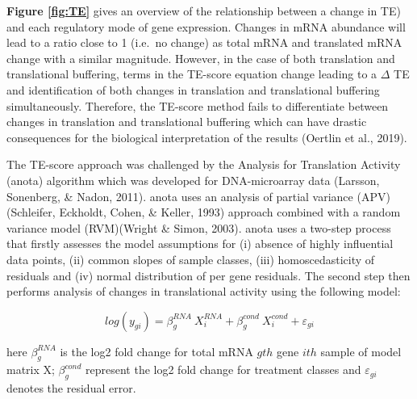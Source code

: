 \documentclass[12pt,openany]{book}
\begin{document}
\textbf{Figure \ref{fig:TE}} gives an overview of the relationship
between a change in TE) and each regulatory mode of gene expression.
Changes in mRNA abundance will lead to a ratio close to 1 (i.e.~no
change) as total mRNA and translated mRNA change with a similar
magnitude. However, in the case of both translation and translational
buffering, terms in the TE-score equation change leading to a
\(\varDelta\) TE and identification of both changes in translation and
translational buffering simultaneously. Therefore, the TE-score method
fails to differentiate between changes in translation and translational
buffering which can have drastic consequences for the biological
interpretation of the results (Oertlin et al., 2019).

The TE-score approach was challenged by the Analysis for Translation
Activity (anota) algorithm which was developed for DNA-microarray data
(Larsson, Sonenberg, \& Nadon, 2011). anota uses an analysis of partial
variance (APV)(Schleifer, Eckholdt, Cohen, \& Keller, 1993) approach
combined with a random variance model (RVM)(Wright \& Simon, 2003).
anota uses a two-step process that firstly assesses the model
assumptions for (i) absence of highly influential data points, (ii)
common slopes of sample classes, (iii) homoscedasticity of residuals and
(iv) normal distribution of per gene residuals. The second step then
performs analysis of changes in translational activity using the
following model:

\[log(y_{gi}) = \beta_g^{RNA}\ X_i^{RNA}+ \beta_g^{cond}\ X_i^{cond} + \varepsilon_{gi}\]

here \(\beta_g^{RNA}\) is the log2 fold change for total mRNA \(gth\)
gene \(ith\) sample of model matrix X; \(\beta_g^{cond}\) represent the
log2 fold change for treatment classes and \(\varepsilon_{gi}\) denotes
the residual error.
\end{document}
